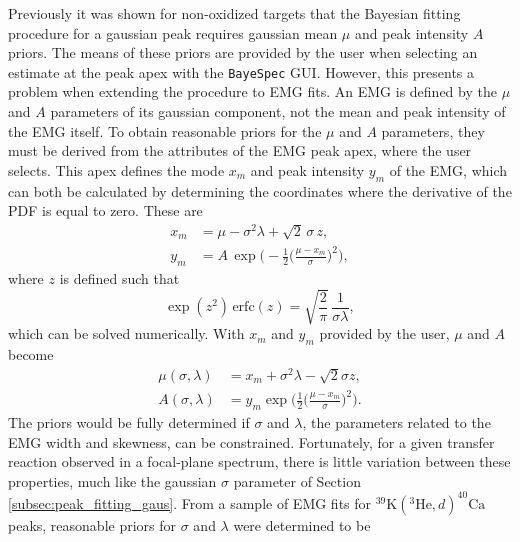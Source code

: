 Previously it was shown for non-oxidized targets that the Bayesian fitting procedure for a gaussian peak requires gaussian mean $\mu$ and peak intensity $A$ priors. The means of these priors are provided by the user when selecting an estimate at the peak apex with the \texttt{BayeSpec} GUI. However, this presents a problem when extending the procedure to EMG fits. An EMG is defined by the $\mu$ and $A$ parameters of its gaussian component, not the mean and peak intensity of the EMG itself. To obtain reasonable priors for the $\mu$ and $A$ parameters, they must be derived from the attributes of the EMG peak apex, where the user selects. This apex defines the mode $x_{m}$ and peak intensity $y_{m}$ of the EMG, which can both be calculated by determining the coordinates where the derivative of the PDF is equal to zero. These are
\begin{align}
    x_{m} &= \mu - \sigma^{2}\lambda + \sqrt{2} \, \sigma \, z, \nonumber \\
    y_{m} &= A \, \exp \Big( -\frac{1}{2} \Big( \frac{\mu - x_{m}}{\sigma} \Big)^{2} \Big), \label{eqn:mode_peak_intensity}
\end{align}
where $z$ is defined such that
\begin{equation}
    \exp(z^{2}) \, \mathrm{erfc}(z) = \sqrt{\frac{2}{\pi}} \, \frac{1}{\sigma\lambda},
\end{equation}
which can be solved numerically. With $x_{m}$ and $y_{m}$ provided by the user, $\mu$ and $A$ become
\begin{align}
    \mu(\sigma, \lambda) &= x_{m} + \sigma^{2} \lambda - \sqrt{2} \sigma z, \label{eqn:mu_before} \\
    A(\sigma, \lambda) &= y_{m} \exp \Big( \frac{1}{2} \Big( \frac{\mu-x_{m}}{\sigma} \Big)^{2} \Big). \label{eqn:A_before}
\end{align}
The priors would be fully determined if $\sigma$ and $\lambda$, the parameters related to the EMG width and skewness, can be constrained. Fortunately, for a given transfer reaction observed in a focal-plane spectrum, there is little variation between these properties, much like the gaussian $\sigma$ parameter of Section \ref{subsec:peak_fitting_gaus}. From a sample of EMG fits for $^{39}\mathrm{K}(^{3}\mathrm{He},d)^{40}\mathrm{Ca}$ peaks, reasonable priors for $\sigma$ and $\lambda$ were determined to be
